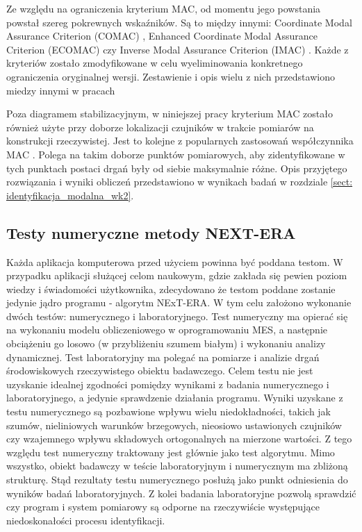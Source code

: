Ze względu na ograniczenia kryterium MAC, od momentu jego powstania powstał szereg pokrewnych wskaźników. Są to między innymi: Coordinate Modal Assurance Criterion (COMAC) \parencite{Ewins2000}, Enhanced Coordinate Modal Assurance Criterion (ECOMAC) \parencite{Hunt1992} czy Inverse Modal Assurance Criterion (IMAC) \parencite{MITCHELL1998}. Każde z kryteriów zostało zmodyfikowane w celu wyeliminowania konkretnego ograniczenia oryginalnej wersji. Zestawienie i opis wielu z nich przedstawiono miedzy innymi w pracach \parencite{Allemang2003,Rainieri2014,Szafranski2013,Salamak2003} 

Poza diagramem stabilizacyjnym, w niniejszej pracy kryterium MAC zostało również użyte przy doborze lokalizacji czujników w trakcie pomiarów na konstrukcji rzeczywistej. Jest to kolejne z popularnych zastosowań współczynnika MAC \parencite{Allemang2003}. Polega na takim doborze punktów pomiarowych, aby zidentyfikowane w tych punktach postaci drgań były od siebie maksymalnie różne. Opis przyjętego rozwiązania i wyniki obliczeń przedstawiono w wynikach badań w rozdziale \ref{sect: identyfikacja_modalna_wk2}.




\subsection{Testy numeryczne metody NEXT-ERA}
Każda aplikacja komputerowa przed użyciem powinna być poddana testom. W przypadku aplikacji służącej celom naukowym, gdzie zakłada się pewien poziom wiedzy i świadomości użytkownika, zdecydowano że testom poddane zostanie jedynie jądro programu - algorytm NExT-ERA. W tym celu założono wykonanie dwóch testów: numerycznego i laboratoryjnego. Test numeryczny ma opierać się na wykonaniu modelu obliczeniowego w oprogramowaniu MES, a następnie obciążeniu go losowo (w przybliżeniu szumem białym) i wykonaniu analizy dynamicznej. Test laboratoryjny ma polegać na pomiarze i analizie drgań środowiskowych rzeczywistego obiektu badawczego. Celem testu nie jest uzyskanie idealnej zgodności pomiędzy wynikami z badania numerycznego i laboratoryjnego, a jedynie sprawdzenie działania programu. Wyniki uzyskane z testu numerycznego są pozbawione wpływu wielu niedokładności, takich jak szumów, nieliniowych warunków brzegowych, nieosiowo ustawionych czujników czy wzajemnego wpływu składowych ortogonalnych na mierzone wartości. Z tego względu test numeryczny traktowany jest głównie jako test algorytmu. Mimo wszystko, obiekt badawczy w teście laboratoryjnym i numerycznym ma zbliżoną strukturę. Stąd rezultaty testu numerycznego posłużą jako punkt odniesienia do wyników badań laboratoryjnych. Z kolei badania laboratoryjne pozwolą sprawdzić czy program i system pomiarowy są odporne na rzeczywiście występujące niedoskonałości procesu identyfikacji.

